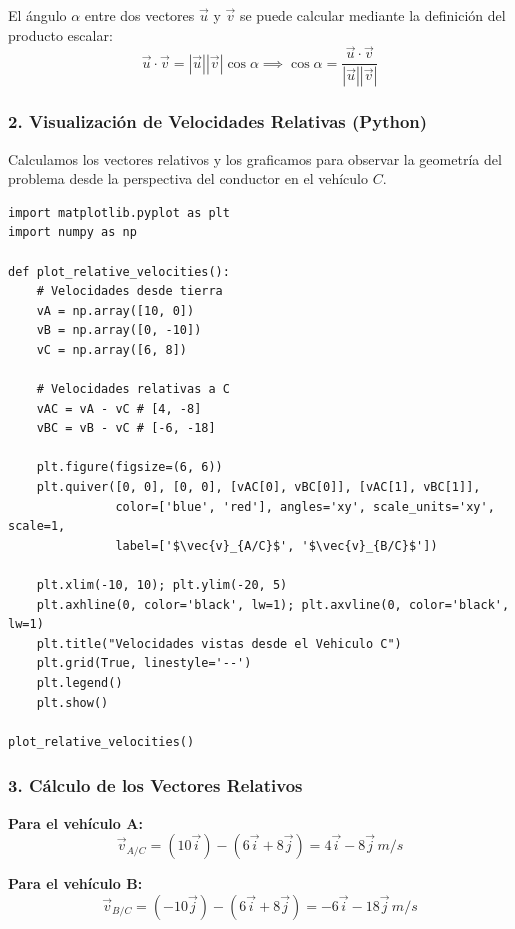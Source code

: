 \documentclass[12pt, a4paper]{article}
\begin{document}
El ángulo $\alpha$ entre dos vectores $\vec{u}$ y $\vec{v}$ se puede calcular mediante la definición del producto escalar:
\begin{equation}
    \vec{u} \cdot \vec{v} = |\vec{u}| |\vec{v}| \cos \alpha \implies \cos \alpha = \frac{\vec{u} \cdot \vec{v}}{|\vec{u}| |\vec{v}|}
\end{equation}

\subsubsection*{2. Visualización de Velocidades Relativas (Python)}

Calculamos los vectores relativos y los graficamos para observar la geometría del problema desde la perspectiva del conductor en el vehículo $C$.

\begin{lstlisting}
import matplotlib.pyplot as plt
import numpy as np

def plot_relative_velocities():
    # Velocidades desde tierra
    vA = np.array([10, 0])
    vB = np.array([0, -10])
    vC = np.array([6, 8])
    
    # Velocidades relativas a C
    vAC = vA - vC # [4, -8]
    vBC = vB - vC # [-6, -18]
    
    plt.figure(figsize=(6, 6))
    plt.quiver([0, 0], [0, 0], [vAC[0], vBC[0]], [vAC[1], vBC[1]], 
               color=['blue', 'red'], angles='xy', scale_units='xy', scale=1, 
               label=['$\vec{v}_{A/C}$', '$\vec{v}_{B/C}$'])
    
    plt.xlim(-10, 10); plt.ylim(-20, 5)
    plt.axhline(0, color='black', lw=1); plt.axvline(0, color='black', lw=1)
    plt.title("Velocidades vistas desde el Vehiculo C")
    plt.grid(True, linestyle='--')
    plt.legend()
    plt.show()

plot_relative_velocities()
\end{lstlisting}

\subsubsection*{3. Cálculo de los Vectores Relativos}

\textbf{Para el vehículo A:}
\begin{equation}
    \vec{v}_{A/C} = (10\vec{i}) - (6\vec{i} + 8\vec{j}) = 4\vec{i} - 8\vec{j} \, \si{m/s}
\end{equation}

\textbf{Para el vehículo B:}
\begin{equation}
    \vec{v}_{B/C} = (-10\vec{j}) - (6\vec{i} + 8\vec{j}) = -6\vec{i} - 18\vec{j} \, \si{m/s}
\end{equation}
\end{document}
